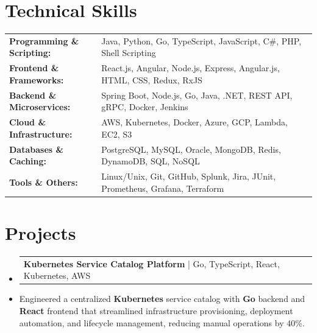 \documentclass[letterpaper,10pt]{article}
\makeatletter
\newcommand{\resumeItem}[1]{
  \item{\fontsize{8pt}{9pt}\selectfont
    #1 \vspace{-3pt}
  }
}
\newcommand{\resumeProjectHeading}[2]{
    \item
    \begin{tabular*}{1.001\textwidth}{l@{\extracolsep{\fill}}r}
      \fontsize{8.5pt}{10pt}#1 & \textbf{\fontsize{8.5pt}{10pt} #2}\\
    \end{tabular*}\vspace{-7pt}
}
\newcommand{\resumeSubHeadingListStart}{\begin{itemize}[leftmargin=0pt, label={}]}
\newcommand{\resumeItemListStart}{\begin{itemize}[leftmargin=*]}
\newcommand{\resumeItemListEnd}{\end{itemize}\vspace{-5pt}}
\makeatother
\begin{document}
\section{Technical Skills}
        \vspace{-14pt}
        \begin{table}[h]
            \fontsize{8pt}{9pt}\selectfont
            \begin{tabular}{p{0.3\linewidth} p{0.7\linewidth}}
                \textbf{Programming \& Scripting:} & Java, Python, Go, TypeScript, JavaScript, C\#, PHP, Shell Scripting \\
                \textbf{Frontend \& Frameworks:} & React.js, Angular, Node.js, Express, Angular.js, HTML, CSS, Redux, RxJS \\
                \textbf{Backend \& Microservices:} & Spring Boot, Node.js, Go, Java, .NET, REST API, gRPC, Docker, Jenkins \\
                \textbf{Cloud \& Infrastructure:} & AWS, Kubernetes, Docker, Azure, GCP, Lambda, EC2, S3 \\
                \textbf{Databases \& Caching:} & PostgreSQL, MySQL, Oracle, MongoDB, Redis, DynamoDB, SQL, NoSQL \\
                \textbf{Tools \& Others:} & Linux/Unix, Git, GitHub, Splunk, Jira, JUnit, Prometheus, Grafana, Terraform \\
            \end{tabular}
        \end{table}
 \vspace{-18pt}

\section{Projects}
    \vspace{-5pt}
    \resumeSubHeadingListStart
          \resumeProjectHeading
            {\textbf{Kubernetes Service Catalog Platform} | Go, TypeScript, React, Kubernetes, AWS}
            \resumeItemListStart
                \resumeItem{Engineered a centralized \textbf{Kubernetes} service catalog with \textbf{Go} backend and \textbf{React} frontend that streamlined infrastructure provisioning, deployment automation, and lifecycle management, reducing manual operations by 40\%.}
            \resumeItemListEnd
        \vspace{-12pt}
    
\end{document}
